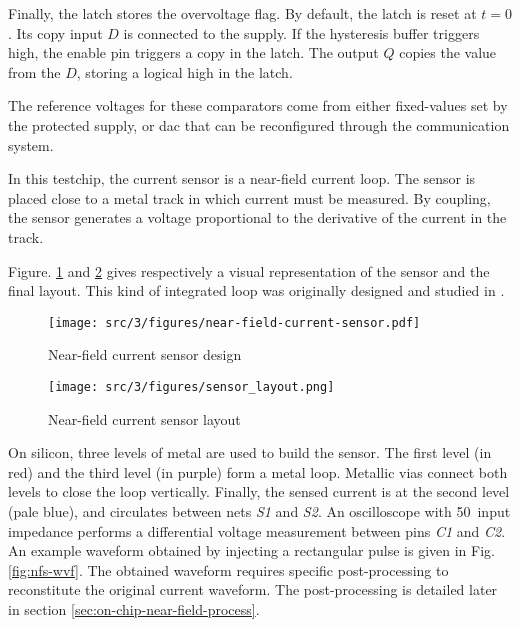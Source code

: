 Finally, the latch stores the overvoltage flag.
By default, the latch is reset at $t=0$.
Its copy input $D$ is connected to the supply.
If the hysteresis buffer triggers high, the enable pin triggers a copy in the latch.
The output $Q$ copies the value from the $D$, storing a logical high in the latch.

The reference voltages for these comparators come from either fixed-values set by the protected supply, or \gls{dac} that can be reconfigured through the communication system.


In this testchip, the current sensor is a near-field current loop.
The sensor is placed close to a metal track in which current must be measured.
By coupling, the sensor generates a voltage proportional to the derivative of the current in the track.

Figure. \ref{fig:near-field-current-sensor} and \ref{fig:near-field-current-sensor-layout} gives respectively a visual representation of the sensor and the final layout.
This kind of integrated loop was originally designed and studied in \cite{AlainSallesInductors}.

\begin{figure}[!h]
  \centering
  \texttt{[image: src/3/figures/near-field-current-sensor.pdf]}
  \caption{Near-field current sensor design}
  \label{fig:near-field-current-sensor}
\end{figure}

\begin{figure}[!h]
  \centering
  \texttt{[image: src/3/figures/sensor\_layout.png]}
  \caption{Near-field current sensor layout}
  \label{fig:near-field-current-sensor-layout}
\end{figure}

On silicon, three levels of metal are used to build the sensor.
The first level (in red) and the third level (in purple) form a metal loop.
Metallic vias connect both levels to close the loop vertically.
Finally, the sensed current is at the second level (pale blue), and circulates between nets \textit{S1} and \textit{S2}.
An oscilloscope with 50\textOmega\ input impedance performs a differential voltage measurement between pins \textit{C1} and \textit{C2}.
An example waveform obtained by injecting a rectangular pulse is given in Fig. \ref{fig:nfs-wvf}.
The obtained waveform requires specific post-processing to reconstitute the original current waveform.
The post-processing is detailed later in section \ref{sec:on-chip-near-field-process}.
